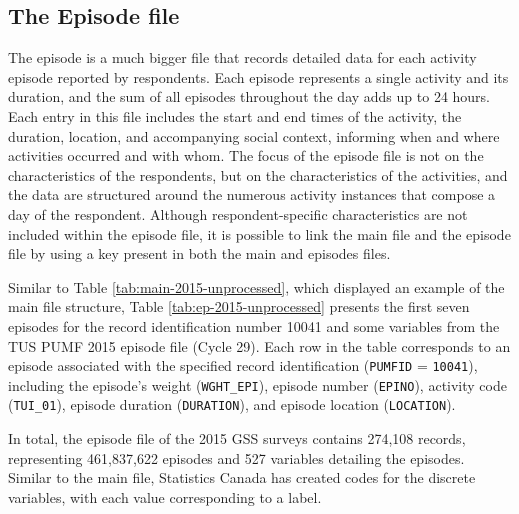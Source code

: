 \documentclass[Royal,times,sageh]{sagej}
\begin{document}
\subsection{The Episode file}\label{the-episode-file}

The episode is a much bigger file that records detailed data for each
activity episode reported by respondents. Each episode represents a
single activity and its duration, and the sum of all episodes throughout
the day adds up to 24 hours. Each entry in this file includes the start
and end times of the activity, the duration, location, and accompanying
social context, informing when and where activities occurred and with
whom. The focus of the episode file is not on the characteristics of the
respondents, but on the characteristics of the activities, and the data
are structured around the numerous activity instances that compose a day
of the respondent. Although respondent-specific characteristics are not
included within the episode file, it is possible to link the main file
and the episode file by using a key present in both the main and
episodes files.

Similar to Table \ref{tab:main-2015-unprocessed}, which displayed an
example of the main file structure, Table \ref{tab:ep-2015-unprocessed}
presents the first seven episodes for the record identification number
10041 and some variables from the TUS PUMF 2015 episode file (Cycle 29).
Each row in the table corresponds to an episode associated with the
specified record identification (\texttt{PUMFID} = \texttt{10041}),
including the episode's weight (\texttt{WGHT\_EPI}), episode number
(\texttt{EPINO}), activity code (\texttt{TUI\_01}), episode duration
(\texttt{DURATION}), and episode location (\texttt{LOCATION}).

In total, the episode file of the 2015 GSS surveys contains 274,108
records, representing 461,837,622 episodes and 527 variables detailing
the episodes. Similar to the main file, Statistics Canada has created
codes for the discrete variables, with each value corresponding to a
label.
\end{document}
